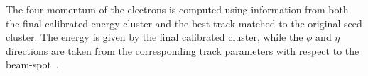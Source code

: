 The four-momentum of the electrons is computed using information from both the final calibrated energy cluster and the best track matched to the original seed cluster.
The energy is given by the final calibrated cluster, while the $\phi$ and $\eta$ directions are taken from the corresponding track parameters with respect to the beam-spot~\cite{Aaboud:2019ynx}.



